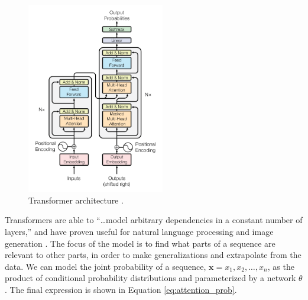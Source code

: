 \documentclass[letterpaper]{article} %
\begin{document}
\begin{figure}[htbp]
\centerline{\includegraphics[width=6cm]{attention_architecture.png}}
\caption{Transformer architecture
\cite{attention_need}.}
\label{fig:attention}
\end{figure}

%

Transformers are able to
``\dots model arbitrary dependencies
in a constant number of layers,''
and have proven useful for natural language processing and image generation
\cite{generative_transformers}.
The focus of the model is to find what parts of a sequence are relevant to other parts,
in order to make generalizations and extrapolate from the data.
We can model the joint probability of a sequence,
$\mathbf{x}={x_1,x_2,\dots,x_n}$,
as the product of conditional
probability distributions and parameterized by a network $\theta$
\cite{generative_transformers}.
The final expression is shown in Equation \ref{eq:attention_prob}.
\end{document}
